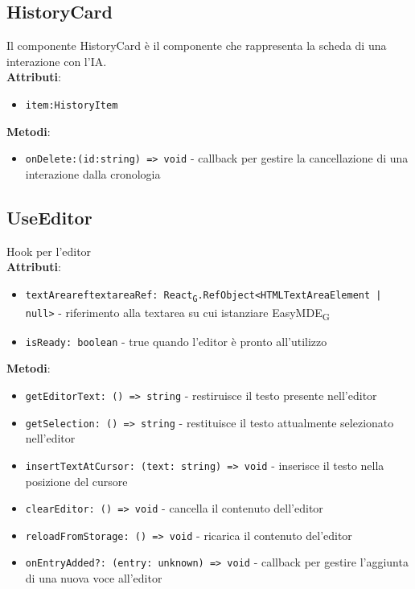 \documentclass[11pt,a4paper]{article}
\newcommand{\gls}[1]{#1\textsubscript{G}}
\begin{document}
\subsection{HistoryCard}
Il componente HistoryCard è il componente che rappresenta la scheda di una interazione con l'IA.\\

\textbf{Attributi}:
\begin{itemize}
    \item \texttt{item:HistoryItem}
\end{itemize}

\textbf{Metodi}:
\begin{itemize}
    \item \texttt{onDelete:(id:string) => void} - callback per gestire la cancellazione di una interazione dalla cronologia
\end{itemize}

\subsection{UseEditor}
Hook per l'editor\\

\textbf{Attributi}:
\begin{itemize}
    \item \texttt{textAreareftextareaRef: \gls{React}.RefObject<HTMLTextAreaElement | null>} - riferimento alla textarea su cui istanziare \gls{EasyMDE}
    \item \texttt{isReady: boolean} - true quando l'editor è pronto all'utilizzo
\end{itemize}

\textbf{Metodi}:
\begin{itemize}
    \item \texttt{getEditorText: () => string} - restiruisce il testo presente nell'editor
    \item \texttt{getSelection: () => string} - restituisce il testo attualmente selezionato nell'editor
    \item \texttt{insertTextAtCursor: (text: string) => void} - inserisce il testo nella posizione del cursore
    \item \texttt{clearEditor: () => void} - cancella il contenuto dell'editor
    \item \texttt{reloadFromStorage: () => void} - ricarica il contenuto del'editor
    \item \texttt{onEntryAdded?: (entry: unknown) => void} - callback per gestire l'aggiunta di una nuova voce all'editor
\end{itemize}
\end{document}
